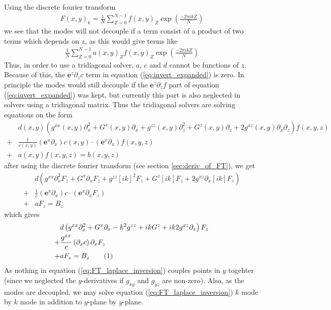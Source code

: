 \documentclass[12pt]{article}
\def\L{\left}
\def\R{\right}
\newcommand{\ve}[1]{\ensuremath{\boldsymbol{#1}}}
\newcommand\numberthis{\addtocounter{equation}{1}\tag{\theequation}}
\begin{document}
Using the discrete fourier transform
%
\begin{align}
    F(x,y)_{k} = \frac{1}{N}\sum_{Z=0}^{N-1}f(x,y)_{Z}\exp\L(\frac{-2\pi i k
    Z}{N}\R)
\end{align}
%
we see that the modes will not decouple if a term consist of a product of two
terms which depends on $z$, as this would give terms like
%
\begin{align*}
    \frac{1}{N}\sum_{Z=0}^{N-1} a(x,y)_Z f(x,y)_Z \exp\L(\frac{-2\pi i k
    Z}{N}\R)
\end{align*}
%
Thus, in order to use a tridiagonal solver, $a$, $c$ and $d$ cannot be
functions of $z$. Because of this, the $\ve{e}^z \partial_z c$ term in equation
(\ref{eq:invert_expanded}) is zero. In principle the modes would still decouple
if the $\ve{e}^z \partial_z f$ part of equation (\ref{eq:invert_expanded}) was
kept, but currently this part is also neglected in solvers using a tridiagonal
matrix. Thus the tridiagonal solvers are solving equations on the form
%
\begin{align*}
    \, &d(x,y) \L(    g^{xx}(x,y) \partial_x^2 + G^x(x,y) \partial_x +
    g^{zz}(x,y) \partial_z^2 + G^z(x,y) \partial_z + 2g^{xz}(x,y) \partial_x
    \partial_z \R) f(x,y,z) \\
%
    +& \frac{1}{c(x,y)}\L( \ve{e}^x \partial_x \R) c(x,y) \cdot \L( \ve{e}^x
    \partial_x \R) f(x,y,z) \\
%
   +& a(x,y)f(x,y,z) = b(x,y,z)
\end{align*}
%
after using the discrete fourier transform (see section \ref{sec:deriv_of_FT}),
we get
%
\begin{align*}
    \, &d \L(    g^{xx} \partial_x^2F_z + G^x \partial_xF_z + g^{zz} [i k]^2F_z
    + G^z [i k]F_z + 2g^{xz} \partial_x[i k]F_z \R) \\
%
    +& \frac{1}{c}\L( \ve{e}^x \partial_x \R) c \cdot \L( \ve{e}^x
    \partial_xF_z \R) \\
%
    +& aF_z = B_z
\end{align*}
%
which gives
%
\begin{align*}
    \, &d \L(    g^{xx} \partial_x^2 + G^x \partial_x - k^2 g^{zz} + i kG^z + i
    k2g^{xz} \partial_x \R)F_z \\
%
    +& \frac{g^{xx}}{c} \L( \partial_x c \R) \partial_xF_z \\
%
    +& aF_z = B_z \numberthis
    \label{eq:FT_laplace_inversion}
\end{align*}
%
As nothing in equation (\ref{eq:FT_laplace_inversion}) couples points in $y$
togehter (since we neglected the $y$-derivatives if $g_{xy}$ and $g_{yz}$ are
non-zero). Also, as the modes are decoupled, we may solve equation
(\ref{eq:FT_laplace_inversion})  $k$ mode by $k$ mode in addition to $y$-plane
by $y$-plane.
\end{document}
